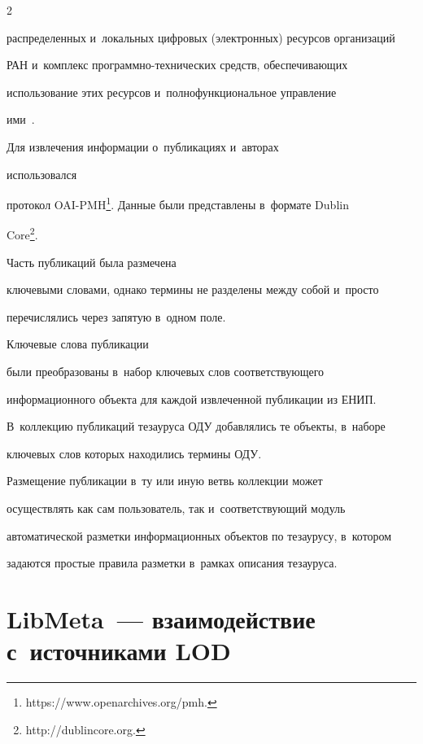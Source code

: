 \begin{multicols}{2}



\noindent

распределенных и~локальных цифровых (электронных) ресурсов организаций 

РАН и~комплекс про\-граммно-тех\-ни\-че\-ских средств, обеспе\-чи\-ва\-ющих 

использование этих ресурсов и~полнофункциональное управление 

ими~\cite{9-ser}. 



Для извлечения информации о~публикациях и~авторах 

использовался

 протокол OAI-PMH\footnote[1]{{\sf 

https://www.openarchives.org/pmh.}}. Данные были представлены в~формате Dublin 

Core\footnote[2]{{\sf http://dublincore.org.}}. 

%

Часть публикаций была размечена 

ключевыми словами, однако термины не разделены между собой и~просто 

перечислялись через запятую в~одном поле. 

%

Ключевые слова пуб\-ли\-ка\-ции 

были преобразованы в~набор ключевых слов соответствующего 

информационного объекта для каждой извлеченной публикации из ЕНИП. 



В~коллекцию публикаций тезауруса ОДУ добавлялись те объекты, в~наборе 

ключевых слов которых находились термины ОДУ. 

    

    Размещение публикации в~ту или иную ветвь коллекции может 

осуществлять как сам пользователь, так и~соответствующий модуль 

автоматической разметки информационных объектов по тезаурусу, в~котором 

задаются простые правила разметки в~рамках описания тезауруса.

    

\section{LibMeta~--- взаимодействие с~источниками LOD}




\end{multicols}
